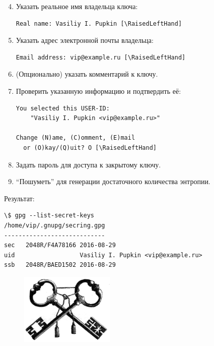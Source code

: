\documentclass[presentation]{beamer}
\newcommand{\RaisedLeftHand}{%
  \raisebox{-.50em}{\Large\HandLeft}
}
\newcommand{\EndOfSectionOrnament}{
  \begin{center}
    \pgfornament[width=0.5\textwidth]{88}
    \end{center}
}
\begin{document}
\begin{frame}[fragile]{}
  \begin{enumerate}
    \setcounter{enumi}{3}
  \item Указать реальное имя владельца ключа:
    \small
\begin{Verbatim}[commandchars=\\\[\]]
Real name: Vasiliy I. Pupkin [\RaisedLeftHand]
\end{Verbatim}
  \item Указать адрес электронной почты владельца:
\begin{Verbatim}[commandchars=\\\[\]]
Email address: vip@example.ru [\RaisedLeftHand]
\end{Verbatim}

  \item (Опционально) указать комментарий к ключу.
\item Проверить указанную информацию и подтвердить её:
  \small
  \begin{Verbatim}[commandchars=\\\[\]]
You selected this USER-ID:
    "Vasiliy I. Pupkin <vip@example.ru>"

Change (N)ame, (C)omment, (E)mail
  or (O)kay/(Q)uit? O [\RaisedLeftHand]
  \end{Verbatim}
  \normalsize
\item Задать пароль для доступа к закрытому ключу.
\item ``Пошуметь'' для генерации достаточного количества энтропии.
    \end{enumerate}

\end{frame}

\begin{frame}[fragile]{}
  Результат:
  \begin{Verbatim}[commandchars=\\\[\]]
\$ gpg --list-secret-keys
/home/vip/.gnupg/secring.gpg
----------------------------
sec   2048R/F4A78166 2016-08-29
uid                  Vasiliy I. Pupkin <vip@example.ru>
ssb   2048R/BAED1502 2016-08-29
  \end{Verbatim}
  \begin{figure}[htb]
    \centering
    \includegraphics[width=0.4\textwidth]{keys-01}
  \end{figure}
  \EndOfSectionOrnament
\end{frame}
\end{document}
